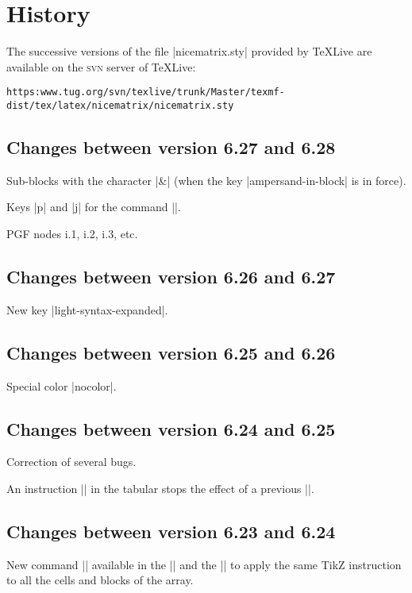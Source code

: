 \documentclass[dvipsnames]{article}%
\begin{document}
\section{History}

The successive versions of the file |nicematrix.sty| provided by TeXLive are available on the
\textsc{svn} server of TeXLive:\par\nobreak

\smallskip
{
\small
\nolinkurl{https:www.tug.org/svn/texlive/trunk/Master/texmf-dist/tex/latex/nicematrix/nicematrix.sty}
}

\subsection*{Changes between version 6.27 and 6.28}

Sub-blocks with the character |&| (when the key |ampersand-in-block| is in
force).

Keys |p| and |j| for the command |\Block|.

PGF nodes i.1, i.2, i.3, etc.

\subsection*{Changes between version 6.26 and 6.27}

New key |light-syntax-expanded|.

\subsection*{Changes between version 6.25 and 6.26}

Special color |nocolor|.

\subsection*{Changes between version 6.24 and 6.25}

Correction of several bugs.

An instruction |\rowlistcolors| in the tabular stops the effect of a previous
|\rowlistcolors|.


\subsection*{Changes between version 6.23 and 6.24}

New command |\TikzEveryCell| available in the |\CodeAfter| and the |\CodeBefore|
to apply the same TikZ instruction to all the cells and blocks of the array.
\end{document}
